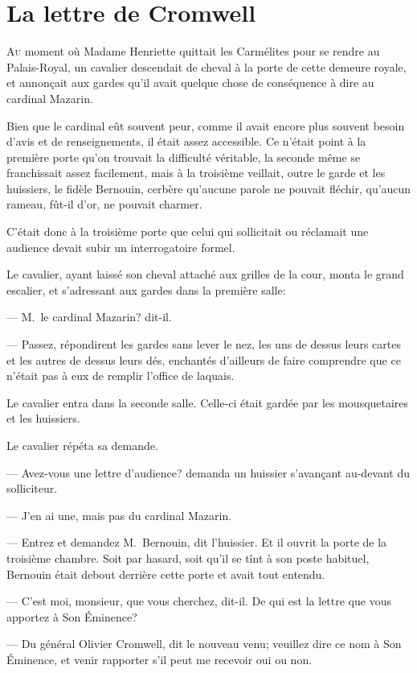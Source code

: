 \chapter{La lettre de Cromwell}

\lettrine{A}{u} moment où Madame Henriette quittait les Carmélites pour se rendre au Palais-Royal, un cavalier descendait de cheval à la porte de cette demeure royale, et annonçait aux gardes qu'il avait quelque chose de conséquence à dire au cardinal Mazarin.

Bien que le cardinal eût souvent peur, comme il avait encore plus souvent besoin d'avis et de renseignements, il était assez accessible. Ce n'était point à la première porte qu'on trouvait la difficulté véritable, la seconde même se franchissait assez facilement, mais à la troisième veillait, outre le garde et les huissiers, le fidèle Bernouin, cerbère qu'aucune parole ne pouvait fléchir, qu'aucun rameau, fût-il d'or, ne pouvait charmer.

C'était donc à la troisième porte que celui qui sollicitait ou réclamait une audience devait subir un interrogatoire formel.

Le cavalier, ayant laissé son cheval attaché aux grilles de la cour, monta le grand escalier, et s'adressant aux gardes dans la première salle:

— M.~le cardinal Mazarin? dit-il.

— Passez, répondirent les gardes sans lever le nez, les uns de dessus leurs cartes et les autres de dessus leurs dés, enchantés d'ailleurs de faire comprendre que ce n'était pas à eux de remplir l'office de laquais.

Le cavalier entra dans la seconde salle. Celle-ci était gardée par les mousquetaires et les huissiers.

Le cavalier répéta sa demande.

— Avez-vous une lettre d'audience? demanda un huissier s'avançant au-devant du solliciteur.

— J'en ai une, mais pas du cardinal Mazarin.

— Entrez et demandez M.~Bernouin, dit l'huissier. Et il ouvrit la porte de la troisième chambre. Soit par hasard, soit qu'il se tînt à son poste habituel, Bernouin était debout derrière cette porte et avait tout entendu.

— C'est moi, monsieur, que vous cherchez, dit-il. De qui est la lettre que vous apportez à Son Éminence?

— Du général Olivier Cromwell, dit le nouveau venu; veuillez dire ce nom à Son Éminence, et venir rapporter s'il peut me recevoir oui ou non.

